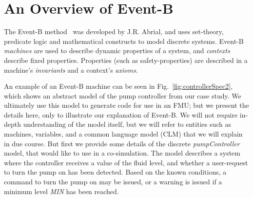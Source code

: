 \documentclass{llncs}%
\begin{document}
\section{An Overview of Event-B}
%
The Event-B method~\cite{ABR10} was developed by J.R. Abrial, and uses set-theory, predicate logic and mathematical constructs to model discrete systems. Event-B \emph{machines} are used to describe dynamic properties of a system, and \emph{contexts} describe fixed properties. Properties (such as safety-properties) are described in a machine's \emph{invariants} and a context's \emph{axioms}. 

An example of an Event-B machine can be seen in Fig.~\ref{fig:controllerSpec2}, which shows an abstract model of the pump controller from our case study. We ultimately use this model to generate code for use in an FMU; but we present the details here, only to illustrate our explanation of Event-B. We will not require in-depth understanding of the model itself, but we will refer to entities such as machines, variables, and a common language model (CLM) that we will explain in due course.  But first we provide some details of the discrete \emph{pumpController} model, that would like to use in a co-simulation. The model describes a system where the controller receives a value of the fluid level, and whether a user-request to turn the pump on has been detected. Based on the known conditions, a command to turn the pump on may be issued, or a warning is issued if a minimum level \emph{MIN} has been reached.    
%
%
\end{document}
